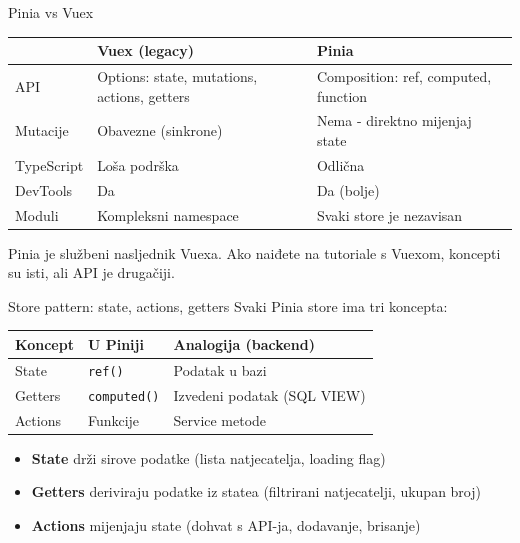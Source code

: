 \begin{frame}{Pinia vs Vuex}
\begin{tabular}{@{}lp{5cm}p{5cm}@{}}
  \toprule
  & \textbf{Vuex (legacy)} & \textbf{Pinia} \\
  \midrule
  API & Options: state, mutations, actions, getters & Composition: ref, computed, function \\
  Mutacije & Obavezne (sinkrone) & Nema - direktno mijenjaj state \\
  TypeScript & Loša podrška & Odlična \\
  DevTools & Da & Da (bolje) \\
  Moduli & Kompleksni namespace & Svaki store je nezavisan \\
  \bottomrule
\end{tabular}

\vspace{0.6em}
Pinia je službeni nasljednik Vuexa. Ako naiđete na tutoriale s Vuexom, koncepti su isti, ali API je drugačiji.
\end{frame}

\begin{frame}{Store pattern: state, actions, getters}
Svaki Pinia store ima tri koncepta:

\vspace{0.4em}
\begin{tabular}{@{}lp{4cm}p{5cm}@{}}
  \toprule
  \textbf{Koncept} & \textbf{U Piniji} & \textbf{Analogija (backend)} \\
  \midrule
  State & \texttt{ref()} & Podatak u bazi \\
  Getters & \texttt{computed()} & Izvedeni podatak (SQL VIEW) \\
  Actions & Funkcije & Service metode \\
  \bottomrule
\end{tabular}

\vspace{0.6em}
\begin{itemize}
  \item \textbf{State} drži sirove podatke (lista natjecatelja, loading flag)
  \item \textbf{Getters} deriviraju podatke iz statea (filtrirani natjecatelji, ukupan broj)
  \item \textbf{Actions} mijenjaju state (dohvat s API-ja, dodavanje, brisanje)
\end{itemize}
\end{frame}

